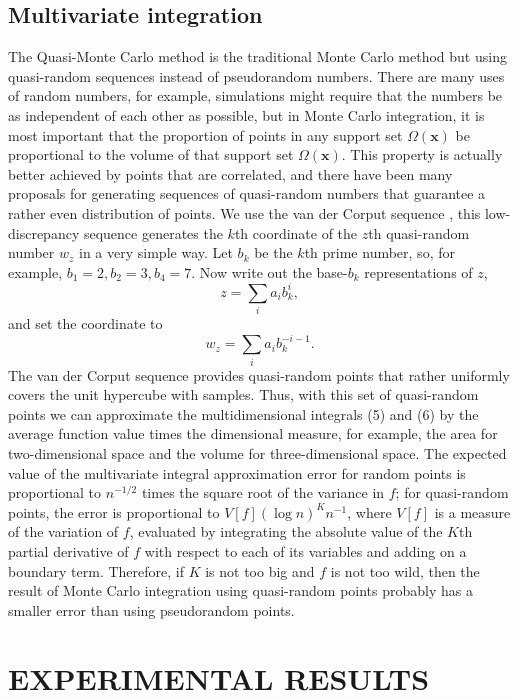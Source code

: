 \documentclass[conference]{IEEEtran}
\begin{document}
\subsection{Multivariate integration} 
The Quasi-Monte Carlo method is the traditional Monte Carlo method but using quasi-random sequences instead of  pseudorandom numbers. There are many uses of random numbers, for example, simulations might require that the numbers be as independent of each other as possible, but in Monte Carlo integration, it is most important that the proportion of points in any support set $\Omega(\mathbf{x})$ be proportional to the volume of that support set $\Omega(\mathbf{x})$. This property is actually better achieved by points that are correlated, and there have been many proposals for generating sequences of quasi-random numbers that guarantee a rather even distribution of points. We use the van der Corput sequence \cite{oleary}, this low-discrepancy sequence generates the $k$th coordinate of the $z$th quasi-random number ${w_z}$ in a very simple way. Let $b_k$ be the $k$th prime number, so, for example, $b_1 = 2, b_2 = 3, b_4 = 7.$ Now write out the base-$b_k$ representations of $z$,
\begin{equation}
z = \sum_{i} a_i b_k^{i},
\end{equation}
and set the coordinate to
\begin{equation}
w_z = \sum_{i} a_i b_k^{-i-1}.
\end{equation}	
The van der Corput sequence provides quasi-random points that rather uniformly covers the unit hypercube with samples. Thus, with this set of quasi-random points we can approximate the multidimensional integrals (5) and (6) by the average function value times the dimensional measure, for example, the area for two-dimensional space and the volume for three-dimensional space. The expected value of the multivariate integral approximation error for random points is proportional to $n^{-1/2}$ times the square root of the variance in $f$; for quasi-random points, the error is proportional to $V[f](\log n)^{K}n^{-1}$, where $V[f]$ is a measure of the variation of $f$, evaluated by integrating the absolute value of the $K$th partial derivative of $f$ with respect to each of its variables and adding on a boundary term. Therefore, if $K$ is not too big and $f$ is not too wild, then the result of Monte Carlo integration using quasi-random points probably has a smaller error than using pseudorandom points.
%
		
\section{EXPERIMENTAL RESULTS}
\end{document}
